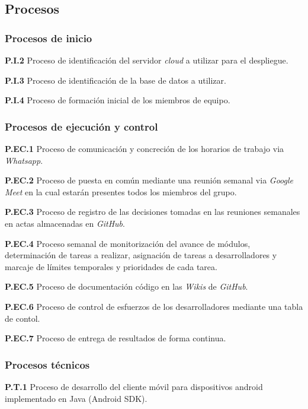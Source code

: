 \documentclass{article}
\begin{document}
\subsection{Procesos}

\subsubsection{Procesos de inicio}

\textbf{P.I.2} Proceso de identificación del servidor \textit{cloud} a utilizar para el despliegue.

\textbf{P.I.3} Proceso de identificación de la base de datos a utilizar.

\textbf{P.I.4} Proceso de formación inicial de los miembros de equipo.

\subsubsection{Procesos de ejecución y control}

\textbf{P.EC.1} Proceso de comunicación y concreción de los horarios de trabajo via \textit{Whatsapp}.

\textbf{P.EC.2} Proceso de puesta en común mediante una reunión semanal via \textit{Google Meet} en la cual estarán presentes todos los miembros del grupo.

\textbf{P.EC.3} Proceso de registro de las decisiones tomadas en las reuniones semanales en actas almacenadas en \textit{GitHub}.

\textbf{P.EC.4} Proceso semanal de monitorización del avance de módulos, determinación de tareas a realizar, asignación de tareas a desarrolladores y marcaje de límites temporales y prioridades de cada tarea.

\textbf{P.EC.5} Proceso de documentación código en las \textit{Wikis} de \textit{GitHub}.

\textbf{P.EC.6} Proceso de control de esfuerzos de los desarrolladores mediante una tabla de contol.

\textbf{P.EC.7} Proceso de entrega de resultados de forma continua.

\subsubsection{Procesos técnicos}

\textbf{P.T.1} Proceso de desarrollo del cliente móvil para dispositivos android implementado en Java (Android SDK).
\end{document}
